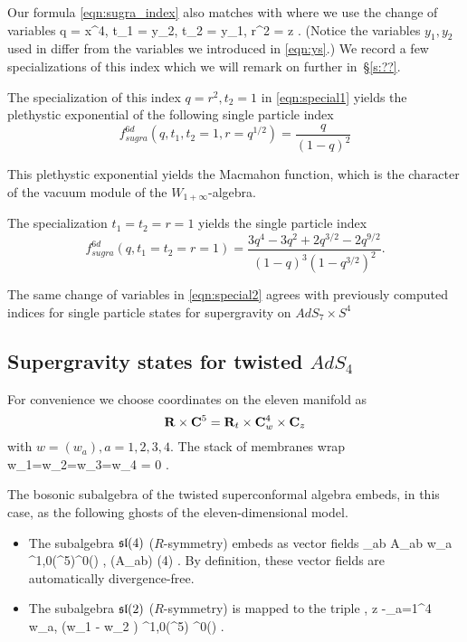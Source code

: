 Our formula \eqref{eqn:sugra_index} also matches with \cite[Eq. (3.24)]{Bhattacharya:2008zy} where we use the change of variables
\beqn
q = x^4, \quad t_1 = y_2, \quad t_2 = y_1, \quad r^2 = z .
\eeqn
(Notice the variables $y_1,y_2$ used in \cite{Bhattacharya:2008zy} differ from the variables we introduced in \eqref{eqn:ys}.)
We record a few specializations of this index which we will remark on further in~\S\ref{s:??}.

\parsec 
The specialization of this index $q=r^2, t_2=1$ in \eqref{eqn:special1} yields the plethystic exponential of the following single particle index
\[
f_{sugra}^{6d}(q, t_1, t_2=1, r = q^{1/2}) = \frac{q}{(1-q)^2}
\]

This plethystic exponential yields the Macmahon function, which is the character of the vacuum module of the $W_{1+\infty}$-algebra.

\parsec

The specialization $t_1=t_2=r=1$ yields the single particle index
\[
f_{sugra}^{6d} (q, t_1=t_2=r=1) = \frac{3 q^4 - 3 q^2 + 2 q^{3/2} - 2 q^{9/2}}{(1-q)^3 (1-q^{3/2})^2} .
\]

\parsec The same change of variables in \eqref{eqn:special2} agrees with previously computed indices for single particle states for supergravity on $AdS_{7}\times S^{4}$  

\subsection{Supergravity states for twisted $AdS_4$}
For convenience we choose coordinates on the eleven manifold as
\[
\mathbf{R} \times \mathbf{C}^5 = \mathbf{R}_t \times \mathbf{C}^4_w \times \mathbf{C}_z
\]
with $w = (w_a), a=1,2,3,4$.
The stack of membranes wrap 
\beqn
w_1=w_2=w_{3}=w_{4} = 0 .
\eeqn

The bosonic subalgebra  of the twisted superconformal algebra embeds, in this case, as the following ghosts of the eleven-dimensional model.
\begin{itemize}
\item
The subalgebra $\mathfrak{sl}(4)$ ($R$-symmetry) embeds as vector fields
\beqn
\sum_{ab} A_{ab} w_a  \in \PV^{1,0}(\C^5)\otimes \Omega^0(\R) , \quad (A_{ab}) \in {}(4) .
\eeqn
By definition, these vector fields are automatically divergence-free.

\item
The subalgebra $\mathfrak{sl}(2)$ ($R$-symmetry) is mapped to the triple
\beqn
 , \quad z -\sum_{a=1}^4 w_a, \quad {} \left(w_1  - w_2 \right) \in \PV^{1,0}(\C^5) \otimes \Omega^0(\R) .
\eeqn
\end{itemize}

